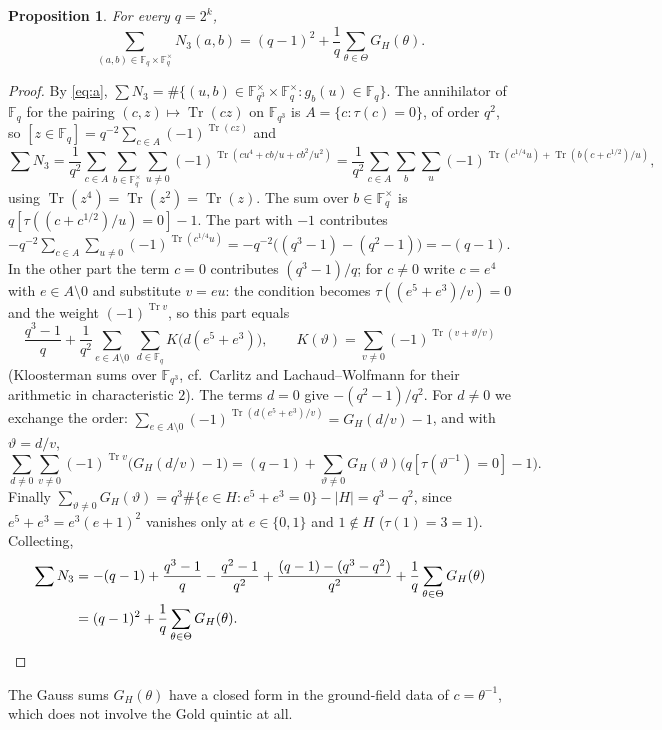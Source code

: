 \documentclass[12pt,a4paper]{amsart}
\newtheorem{proposition}[theorem]{Proposition}
\theoremstyle{definition}
\newcommand{\F}{\mathbb{F}}
\newcommand{\Tr}{\operatorname{Tr}}
\begin{document}
\begin{proposition}\label{prop:N3}
For every $q=2^k$,
\[
\sum_{(a,b)\in\F_q\times\F_q^\times}N_3(a,b)=(q-1)^2+\frac1q\sum_{\theta\in\Theta}G_H(\theta).
\]
\end{proposition}
\begin{proof}
By \eqref{eq:a}, $\sum N_3=\#\{(u,b)\in\F_{q^3}^\times\times\F_q^\times:g_b(u)\in\F_q\}$. The annihilator of $\F_q$ for the pairing $(c,z)\mapsto\Tr(cz)$ on $\F_{q^3}$ is $A=\{c:\tau(c)=0\}$, of order $q^2$, so $[z\in\F_q]=q^{-2}\sum_{c\in A}(-1)^{\Tr(cz)}$ and
\[
\sum N_3=\frac1{q^2}\sum_{c\in A}\sum_{b\in\F_q^\times}\sum_{u\ne0}(-1)^{\Tr(cu^4+cb/u+cb^2/u^2)}=\frac1{q^2}\sum_{c\in A}\sum_{b}\sum_{u}(-1)^{\Tr(c^{1/4}u)+\Tr(b(c+c^{1/2})/u)},
\]
using $\Tr(z^4)=\Tr(z^2)=\Tr(z)$. The sum over $b\in\F_q^\times$ is $q[\tau((c+c^{1/2})/u)=0]-1$. The part with $-1$ contributes $-q^{-2}\sum_{c\in A}\sum_{u\ne0}(-1)^{\Tr(c^{1/4}u)}=-q^{-2}\bigl((q^3-1)-(q^2-1)\bigr)=-(q-1)$. In the other part the term $c=0$ contributes $(q^3-1)/q$; for $c\ne0$ write $c=e^4$ with $e\in A\setminus0$ and substitute $v=eu$: the condition becomes $\tau((e^5+e^3)/v)=0$ and the weight $(-1)^{\Tr v}$, so this part equals
\[
\frac{q^3-1}q+\frac1{q^2}\sum_{e\in A\setminus0}\ \sum_{d\in\F_q}K\bigl(d(e^5+e^3)\bigr),\qquad K(\vartheta)=\sum_{v\ne0}(-1)^{\Tr(v+\vartheta/v)}
\]
(Kloosterman sums over $\F_{q^3}$, cf.\ Carlitz \cite{Carlitz} and Lachaud--Wolfmann \cite{LachaudWolfmann} for their arithmetic in characteristic $2$). The terms $d=0$ give $-(q^2-1)/q^2$. For $d\ne0$ we exchange the order: $\sum_{e\in A\setminus0}(-1)^{\Tr(d(e^5+e^3)/v)}=G_H(d/v)-1$, and with $\vartheta=d/v$,
\[
\sum_{d\ne0}\sum_{v\ne0}(-1)^{\Tr v}\bigl(G_H(d/v)-1\bigr)=(q-1)+\sum_{\vartheta\ne0}G_H(\vartheta)\bigl(q[\tau(\vartheta^{-1})=0]-1\bigr).
\]
Finally $\sum_{\vartheta\ne0}G_H(\vartheta)=q^3\#\{e\in H:e^5+e^3=0\}-|H|=q^3-q^2$, since $e^5+e^3=e^3(e+1)^2$ vanishes only at $e\in\{0,1\}$ and $1\notin H$ ($\tau(1)=3=1$). Collecting,
\begin{align*}
\sum N_3&=-(q-1)+\frac{q^3-1}q-\frac{q^2-1}{q^2}+\frac{(q-1)-(q^3-q^2)}{q^2}+\frac1q\sum_{\theta\in\Theta}G_H(\theta)\\
&=(q-1)^2+\frac1q\sum_{\theta\in\Theta}G_H(\theta).\qedhere
\end{align*}
\end{proof}

The Gauss sums $G_H(\theta)$ have a closed form in the ground-field data of $c=\theta^{-1}$, which does not involve the Gold quintic at all.
\end{document}
